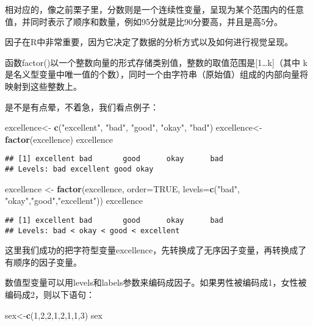 \documentclass[]{book}
\newenvironment{Shaded}{\begin{snugshade}}{\end{snugshade}}
\newcommand{\DataTypeTok}[1]{\textcolor[rgb]{0.13,0.29,0.53}{#1}}
\newcommand{\DecValTok}[1]{\textcolor[rgb]{0.00,0.00,0.81}{#1}}
\newcommand{\KeywordTok}[1]{\textcolor[rgb]{0.13,0.29,0.53}{\textbf{#1}}}
\newcommand{\NormalTok}[1]{#1}
\newcommand{\OtherTok}[1]{\textcolor[rgb]{0.56,0.35,0.01}{#1}}
\newcommand{\StringTok}[1]{\textcolor[rgb]{0.31,0.60,0.02}{#1}}
\begin{document}
相对应的，像之前栗子里，分数则是一个连续性变量，呈现为某个范围内的任意值，并同时表示了顺序和数量，例如95分就是比90分要高，并且是高5分。

因子在R中非常重要，因为它决定了数据的分析方式以及如何进行视觉呈现。

函数factor()以一个整数向量的形式存储类别值，整数的取值范围是{[}1\ldots{}k{]}（其中
k
是名义型变量中唯一值的个数），同时一个由字符串（原始值）组成的内部向量将映射到这些整数上。

是不是有点晕，不着急，我们看点例子：

\begin{Shaded}
\begin{Highlighting}[]
\NormalTok{excellence<-}\StringTok{ }\KeywordTok{c}\NormalTok{(}\StringTok{"excellent"}\NormalTok{, }\StringTok{"bad"}\NormalTok{, }\StringTok{"good"}\NormalTok{, }\StringTok{"okay"}\NormalTok{, }\StringTok{"bad"}\NormalTok{)}
\NormalTok{excellence<-}\StringTok{ }\KeywordTok{factor}\NormalTok{(excellence)}
\NormalTok{excellence}
\end{Highlighting}
\end{Shaded}

\begin{verbatim}
## [1] excellent bad       good      okay      bad      
## Levels: bad excellent good okay
\end{verbatim}

\begin{Shaded}
\begin{Highlighting}[]
\NormalTok{excellence <-}\StringTok{ }\KeywordTok{factor}\NormalTok{(excellence, }\DataTypeTok{order=}\OtherTok{TRUE}\NormalTok{,}
                     \DataTypeTok{levels=}\KeywordTok{c}\NormalTok{(}\StringTok{"bad"}\NormalTok{, }\StringTok{"okay"}\NormalTok{,}\StringTok{"good"}\NormalTok{,}\StringTok{"excellent"}\NormalTok{))}
\NormalTok{excellence}
\end{Highlighting}
\end{Shaded}

\begin{verbatim}
## [1] excellent bad       good      okay      bad      
## Levels: bad < okay < good < excellent
\end{verbatim}

这里我们成功的把字符型变量excellence，先转换成了无序因子变量，再转换成了有顺序的因子变量。

数值型变量可以用levels和labels参数来编码成因子。如果男性被编码成1，女性被编码成2，则以下语句：

\begin{Shaded}
\begin{Highlighting}[]
\NormalTok{sex<-}\KeywordTok{c}\NormalTok{(}\DecValTok{1}\NormalTok{,}\DecValTok{2}\NormalTok{,}\DecValTok{2}\NormalTok{,}\DecValTok{1}\NormalTok{,}\DecValTok{2}\NormalTok{,}\DecValTok{1}\NormalTok{,}\DecValTok{1}\NormalTok{,}\DecValTok{3}\NormalTok{) }
\NormalTok{sex}
\end{Highlighting}
\end{Shaded}
\end{document}
